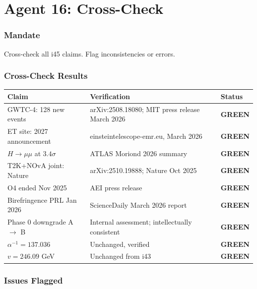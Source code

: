 \documentclass[11pt,a4paper]{article}
\newcommand{\GREEN}{\textcolor{dfdgreen}{\textbf{GREEN}}}
\begin{document}
\part{Agent 16: Cross-Check}
\label{part:agent16}

\section{Mandate}

Cross-check all i45 claims. Flag inconsistencies or errors.

\section{Cross-Check Results}

\begin{center}
\begin{tabular}{lp{8cm}l}
\toprule
\textbf{Claim} & \textbf{Verification} & \textbf{Status} \\
\midrule
GWTC-4: 128 new events & arXiv:2508.18080; MIT press release March 2026 & \GREEN \\
ET site: 2027 announcement & einsteintelescope-emr.eu, March 2026 & \GREEN \\
$H \to \mu\mu$ at $3.4\sigma$ & ATLAS Moriond 2026 summary & \GREEN \\
T2K+NOvA joint: Nature & arXiv:2510.19888; Nature Oct 2025 & \GREEN \\
O4 ended Nov 2025 & AEI press release & \GREEN \\
Birefringence PRL Jan 2026 & ScienceDaily March 2026 report & \GREEN \\
Phase 0 downgrade A $\to$ B & Internal assessment; intellectually consistent & \GREEN \\
$\alpha^{-1} = 137.036$ & Unchanged, verified & \GREEN \\
$v = 246.09$ GeV & Unchanged from i43 & \GREEN \\
\bottomrule
\end{tabular}
\end{center}

\section{Issues Flagged}
\end{document}
